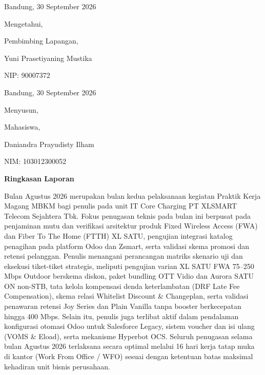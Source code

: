 \documentclass[12pt,a4paper]{article}
\begin{document}
\vspace{5.0cm}
\noindent
\begin{minipage}[t]{0.45\textwidth}
    \centering
    Bandung, 30 September 2026\par
    Mengetahui,\par
    Pembimbing Lapangan,\par
    \vspace{3.0cm}
    Yuni Prasetiyaning Mustika\par
    NIP: 90007372
\end{minipage}
\hfill
\begin{minipage}[t]{0.45\textwidth}
    \centering
    Bandung, 30 September 2026\par
    Menyusun,\par
    Mahasiswa,\par
    \vspace{3.0cm}
    Daniandra Prayudisty Ilham\par
    NIM: 103012300052
\end{minipage}

\clearpage
\setcounter{page}{2}

\begin{center}
    {\bfseries\large Ringkasan Laporan\par}
\end{center}
\vspace{0.8cm}

Bulan Agustus 2026 merupakan bulan kedua pelaksanaan kegiatan Praktik Kerja Magang MBKM bagi penulis pada unit IT Core Charging PT XLSMART Telecom Sejahtera Tbk. Fokus penugasan teknis pada bulan ini berpusat pada penjaminan mutu dan verifikasi arsitektur produk Fixed Wireless Access (FWA) dan Fiber To The Home (FTTH) XL SATU, pengujian integrasi katalog penagihan pada platform Odoo dan Zsmart, serta validasi skema promosi dan retensi pelanggan. Penulis menangani perancangan matriks skenario uji dan eksekusi tiket-tiket strategis, meliputi pengujian varian XL SATU FWA 75--250 Mbps Outdoor berskema diskon, paket bundling OTT Vidio dan Aurora SATU ON non-STB, tata kelola kompensasi denda keterlambatan (DRF Late Fee Compensation), skema relasi Whitelist Discount \& Changeplan, serta validasi penawaran retensi Joy Series dan Plain Vanilla tanpa booster berkecepatan hingga 400 Mbps. Selain itu, penulis juga terlibat aktif dalam pendalaman konfigurasi otomasi Odoo untuk Salesforce Legacy, sistem voucher dan isi ulang (VOMS \& Eload), serta mekanisme Hyperbot OCS. Seluruh penugasan selama bulan Agustus 2026 terlaksana secara optimal melalui 16 hari kerja tatap muka di kantor (Work From Office / WFO) sesuai dengan ketentuan batas maksimal kehadiran unit bisnis perusahaan.
\end{document}
